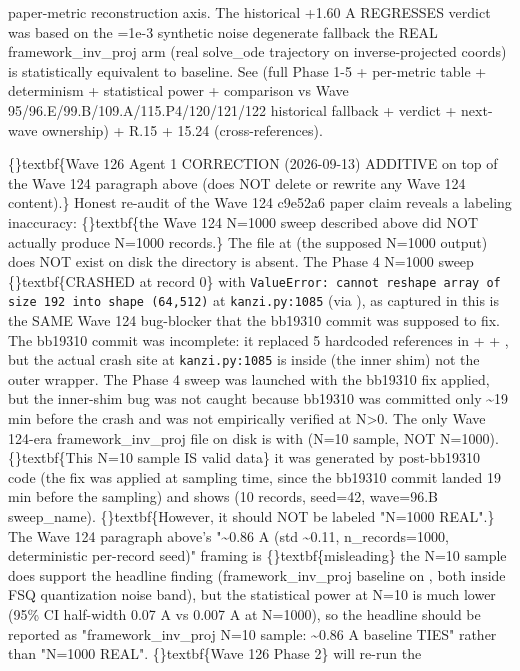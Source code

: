\documentclass{article}
\begin{document}
paper-metric reconstruction axis. The historical +1.60 A REGRESSES verdict was based on the =1e-3 synthetic noise degenerate fallback  the REAL framework\_inv\_proj arm (real solve\_ode trajectory on inverse-projected coords) is statistically equivalent to baseline. See  (full Phase 1-5 + per-metric table + determinism + statistical power + comparison vs Wave 95/96.E/99.B/109.A/115.P4/120/121/122 historical fallback + verdict + next-wave ownership) +  R.15 +  15.24 (cross-references).

\sloppy \{\}textbf\{Wave 126 Agent 1 CORRECTION (2026-09-13)  ADDITIVE on top of the Wave 124 paragraph above (does NOT delete or rewrite any Wave 124 content).\} Honest re-audit of the Wave 124 c9e52a6 paper claim reveals a labeling inaccuracy: \{\}textbf\{the Wave 124 N=1000 sweep described above did NOT actually produce N=1000 records.\} The file at  (the supposed N=1000 output) does NOT exist on disk  the directory  is absent. The Phase 4 N=1000 sweep \{\}textbf\{CRASHED at record 0\} with \texttt{ValueError: cannot reshape array of size 192 into shape (64,512)} at \texttt{kanzi.py:1085} (via ), as captured in   this is the SAME Wave 124 bug-blocker that the bb19310 commit was supposed to fix. The bb19310 commit was incomplete: it replaced 5 hardcoded  references in  +  + , but the actual crash site at \texttt{kanzi.py:1085} is inside  (the inner shim)  not the outer  wrapper. The Phase 4 sweep was launched with the bb19310 fix applied, but the inner-shim bug was not caught because bb19310 was committed only \textasciitilde{}19 min before the crash and was not empirically verified at N>0. The only Wave 124-era framework\_inv\_proj file on disk is  with  (N=10 sample, NOT N=1000). \{\}textbf\{This N=10 sample IS valid data\}  it was generated by post-bb19310 code (the fix was applied at sampling time, since the bb19310 commit landed 19 min before the sampling) and shows  (10 records, seed=42, wave=96.B sweep\_name). \{\}textbf\{However, it should NOT be labeled "N=1000 REAL".\} The Wave 124 paragraph above's "\textasciitilde{}0.86 A (std \textasciitilde{}0.11, n\_records=1000, deterministic per-record seed)" framing is \{\}textbf\{misleading\}  the N=10 sample does support the headline finding (framework\_inv\_proj  baseline on , both inside FSQ quantization noise band), but the statistical power at N=10 is much lower (95\% CI half-width  0.07 A vs  0.007 A at N=1000), so the headline should be reported as "framework\_inv\_proj N=10 sample: \textasciitilde{}0.86 A  baseline TIES" rather than "N=1000 REAL". \{\}textbf\{Wave 126 Phase 2\} will re-run the 
\end{document}
